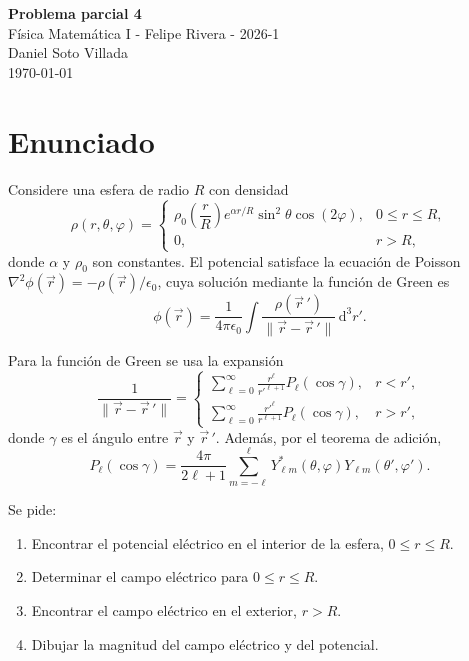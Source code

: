 \documentclass[a4paper,12pt]{article}
\newcommand{\dd}{\,\mathrm{d}}
\begin{document}
\begin{center}
    \Large\textbf{Problema parcial 4}\\
    \normalsize Física Matemática I - Felipe Rivera - 2026-1 \\
    \normalsize Daniel Soto Villada \\
    \normalsize \today \\
\end{center}

\tableofcontents

\section{Enunciado}

Considere una esfera de radio $R$ con densidad
\[
\rho(r,\theta,\varphi)=
\begin{cases}
\rho_0\left(\dfrac{r}{R}\right)e^{\alpha r/R}\sin^2\theta\cos(2\varphi), & 0\le r\le R,\\
0, & r>R,
\end{cases}
\]
donde $\alpha$ y $\rho_0$ son constantes. El potencial satisface la ecuación de Poisson
$\nabla^2\phi(\vec r)=-\rho(\vec r)/\epsilon_0$, cuya solución mediante la función de Green es
\begin{equation}
\label{eq:green-potential}
\phi(\vec r)=\frac{1}{4\pi\epsilon_0}\int \frac{\rho(\vec r\,')}{\lVert \vec r-\vec r\,'\rVert}\dd^3r'.
\end{equation}

Para la función de Green se usa la expansión
\[
\frac{1}{\lVert \vec r-\vec r\,'\rVert}
=\begin{cases}
\displaystyle \sum_{\ell=0}^{\infty}\frac{r^\ell}{r'^{\ell+1}}P_\ell(\cos\gamma), & r<r',\\[0.5em]
\displaystyle \sum_{\ell=0}^{\infty}\frac{r'^\ell}{r^{\ell+1}}P_\ell(\cos\gamma), & r>r',
\end{cases}
\]
donde $\gamma$ es el ángulo entre $\vec r$ y $\vec r\,'$. Además, por el teorema de adición,
\begin{equation}
\label{eq:addition-theorem}
P_\ell(\cos\gamma)=\frac{4\pi}{2\ell+1}\sum_{m=-\ell}^{\ell}
Y_{\ell m}^*(\theta,\varphi)Y_{\ell m}(\theta',\varphi').
\end{equation}

Se pide:
\begin{enumerate}[label=\alph*)]
    \item Encontrar el potencial eléctrico en el interior de la esfera, $0\le r\le R$.
    \item Determinar el campo eléctrico para $0\le r\le R$.
    \item Encontrar el campo eléctrico en el exterior, $r>R$.
    \item Dibujar la magnitud del campo eléctrico y del potencial.
\end{enumerate}
\end{document}
